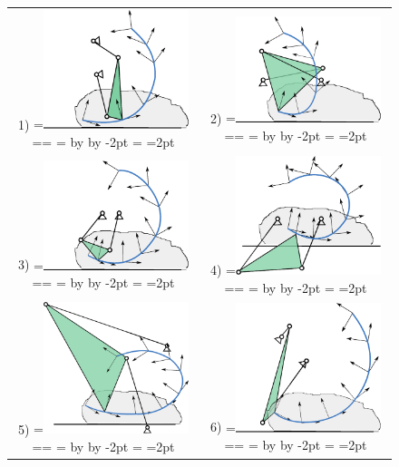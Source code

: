 \documentclass[twocolumn,10pt]{asme2e}
\makeatletter
\newcommand{\putindeepbox}[2][0.7\baselineskip]{{%
    \setbox0=\hbox{#2}%
    \setbox0=\vbox{\noindent\hsize=\wd0\unhbox0}
    \@tempdima=\dp0
    \advance\@tempdima by \ht0
    \advance\@tempdima by -#1\relax
    \dp0=\@tempdima
    \ht0=#1\relax
    \box0
}}
\makeatother
\begin{document}
\begin{figure}
\begin{tabular}{cc}
  1)\putindeepbox[2pt]{\includegraphics[width=120pt]{figure/sol1.eps}}
    & 2)\putindeepbox[2pt]{\includegraphics[width=120pt]{figure/sol2.eps}} \\
  3)\putindeepbox[2pt]{\includegraphics[width=120pt]{figure/sol3.eps}}
    & 4)\putindeepbox[2pt]{\includegraphics[width=120pt]{figure/sol4.eps}}\\
  5)\putindeepbox[2pt]{\includegraphics[width=120pt]{figure/sol6.eps}}
    & 6)\putindeepbox[2pt]{\includegraphics[width=120pt]{figure/sol7.eps}} \\

\end{tabular}
\end{figure}
\end{document}

